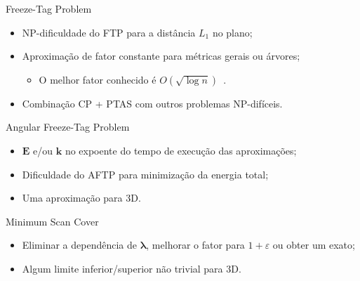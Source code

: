 \subseqslide

\begin{frame}{Freeze-Tag Problem}
  \begin{itemize}[<+->]

    \item NP-dificuldade do FTP para a distância $L_1$ no plano;

    \item Aproximação de fator constante para métricas gerais ou árvores;

    \begin{itemize}[<+->]
        \item O melhor fator conhecido é $O(\sqrt{\log n})$~\cite{Kne05}.
    \end{itemize}

    \item Combinação CP + PTAS com outros problemas NP-difíceis.

  \end{itemize}
\end{frame}

\begin{frame}{Angular Freeze-Tag Problem}
  \begin{itemize}[<+->]

    \item $\mathbf{E}$ e/ou $\mathbf{k}$ no expoente do tempo de execução das aproximações;

    \item Dificuldade do AFTP para minimização da energia total;

    \item Uma aproximação para 3D.

  \end{itemize}
\end{frame}

\begin{frame}{Minimum Scan Cover}
  \begin{itemize}[<+->]

    \item Eliminar a dependência de $\mathbf{\lambda}$, melhorar o fator para $1+\varepsilon$ ou obter um \FPT exato;

    \item Algum limite inferior/superior não trivial para 3D.

  \end{itemize}
\end{frame}
